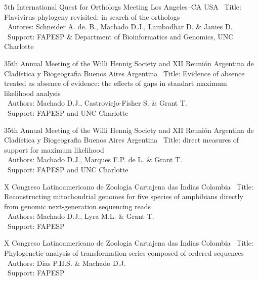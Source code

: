 \documentclass[11pt, letterpaper, sans]{moderncv}
\begin{document}
\vspace{.5em}

	{5th International Quest for Orthologs Meeting}
	{Los Angeles--CA}
	{USA}
	{}
	{
		\textbullet~Title: Flavivirus phylogeny revisited: in search of the orthologs\\
		\textbullet~Autores: Schneider A. de. B., Machado D.J., Lambodhar D. \& Janies D.\\
		\textbullet~Support: FAPESP \& Department of Bioinformatics and Genomics,  UNC Charlotte
	}

\vspace{.5em}

	{35th Annual Meeting of the Willi Hennig Society and XII Reunión Argentina de Cladística y Biogeografia}
	{Buenos Aires}
	{Argentina}
	{}
	{
		\textbullet~Title: Evidence of absence treated as absence of evidence: the effects of gaps in standart maximum likelihood analysis\\
		\textbullet~Authors: Machado D.J., Castroviejo-Fisher S. \& Grant T.\\
		\textbullet~Support: FAPESP and UNC Charlotte
	}

\vspace{.5em}

\cventry{---}
	{35th Annual Meeting of the Willi Hennig Society and XII Reunión Argentina de Cladística y Biogeografia}
	{Buenos Aires}
	{Argentina}
	{}
	{
		\textbullet~Title: direct measures of support for maximum likelihood\\
		\textbullet~Authors: Machado D.J., Marques F.P. de L. \& Grant T.\\
		\textbullet~Support: FAPESP and UNC Charlotte
	}

\vspace{.5em}

	{X Congreso Latinoamericano de Zoologia}
	{Cartajena das Indias}
	{Colombia}
	{}
	{
		\textbullet~Title: Reconstructing mitochondrial genomes for five species of amphibians directly from genomic next-generation sequencing reads\\
		\textbullet~Authors: Machado D.J., Lyra M.L. \& Grant T.\\
		\textbullet~Support: FAPESP
	}

\vspace{.5em}

\cventry{---}
	{X Congreso Latinoamericano de Zoologia}
	{Cartajena das Indias}
	{Colombia}
	{}
	{
		\textbullet~Title: Phylogenetic analysis of transformation series composed of ordered sequences\\
		\textbullet~Authors: Dias P.H.S. \& Machado D.J.\\
		\textbullet~Support: FAPESP
	}
\end{document}
